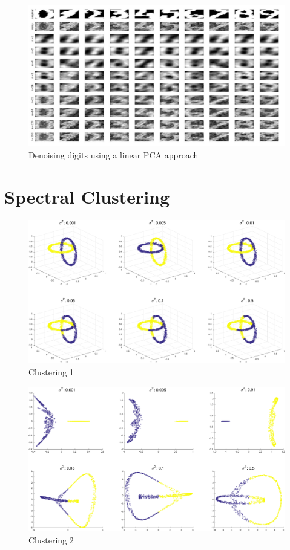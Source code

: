 \documentclass[11pt, a4paper]{article}
\begin{document}
\begin{figure}[H]
  \centering
  \includegraphics[scale=.30]{digitsn_linearpca.jpg}
  \caption{Denoising digits using a linear PCA approach}
  \label{fig:digitsn_linearpc}
\end{figure}

\section{Spectral Clustering}

\begin{figure}[H]
  \centering
  \includegraphics[scale=.40]{sclustering_origcl.pdf}
  \caption{Clustering 1}
  \label{fig:sclustering_origcl}
\end{figure}

\begin{figure}[H]
  \centering
  \includegraphics[scale=.40]{sclustering_origcl2.pdf}
  \caption{Clustering 2}
  \label{fig:sclustering_origcl2}
\end{figure}
\end{document}
